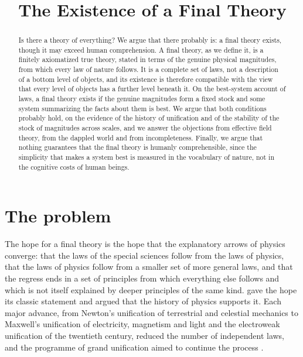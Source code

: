 \documentclass{situationist-preprint}
\title{The Existence of a Final Theory}
\begin{document}
\maketitle

\begin{abstract}
Is there a theory of everything? We argue that there probably is: a final theory exists, though it may exceed human comprehension. A final theory, as we define it, is a finitely axiomatized true theory, stated in terms of the genuine physical magnitudes, from which every law of nature follows. It is a complete set of laws, not a description of a bottom level of objects, and its existence is therefore compatible with the view that every level of objects has a further level beneath it. On the best-system account of laws, a final theory exists if the genuine magnitudes form a fixed stock and some system summarizing the facts about them is best. We argue that both conditions probably hold, on the evidence of the history of unification and of the stability of the stock of magnitudes across scales, and we answer the objections from effective field theory, from the dappled world and from incompleteness. Finally, we argue that nothing guarantees that the final theory is humanly comprehensible, since the simplicity that makes a system best is measured in the vocabulary of nature, not in the cognitive costs of human beings.
\end{abstract}

\section{The problem}

The hope for a final theory is the hope that the explanatory arrows of physics converge: that the laws of the special sciences follow from the laws of physics, that the laws of physics follow from a smaller set of more general laws, and that the regress ends in a set of principles from which everything else follows and which is not itself explained by deeper principles of the same kind. \citet{Weinberg1992} gave the hope its classic statement and argued that the history of physics supports it. Each major advance, from Newton's unification of terrestrial and celestial mechanics to Maxwell's unification of electricity, magnetism and light and the electroweak unification of the twentieth century, reduced the number of independent laws, and the programme of grand unification aimed to continue the process \citep{GeorgiGlashow1974}.
\end{document}
